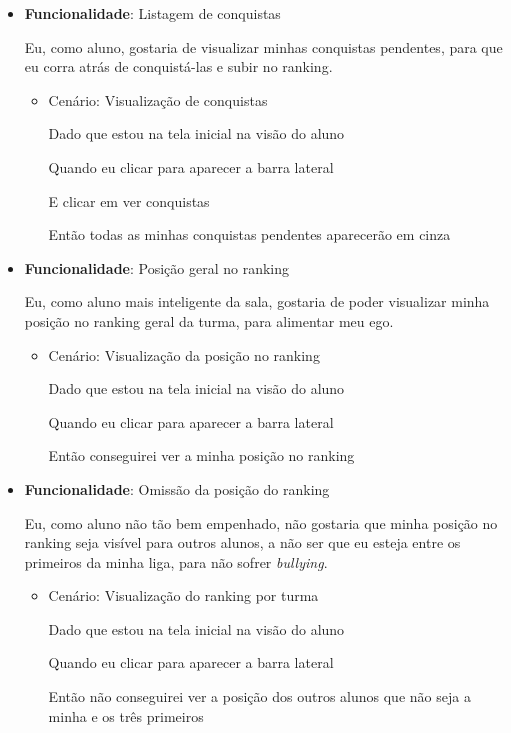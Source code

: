 \begin{itemize}
\item\textbf{Funcionalidade}: Listagem de conquistas
    
    Eu, como aluno, gostaria de visualizar minhas conquistas pendentes, para que eu corra atrás de conquistá-las e subir no ranking.
    \begin{itemize}
        \item Cenário: Visualização de conquistas 
        \par Dado que estou na tela inicial na visão do aluno
        \par Quando eu clicar para aparecer a barra lateral
        \par E clicar em ver conquistas
        \par Então todas as minhas conquistas pendentes aparecerão em cinza
    \end{itemize}  

\item\textbf{Funcionalidade}: Posição geral no ranking
    
    Eu, como aluno mais inteligente da sala, gostaria de poder visualizar minha posição no ranking geral da turma, para alimentar meu ego.
    \begin{itemize}
        \item Cenário: Visualização da posição no ranking
        \par Dado que estou na tela inicial na visão do aluno
        \par Quando eu clicar para aparecer a barra lateral
        \par Então conseguirei ver a minha posição no ranking
    \end{itemize}  

\item\textbf{Funcionalidade}: Omissão da posição do ranking
    
    Eu, como aluno não tão bem empenhado, não gostaria que minha posição no ranking seja visível para outros alunos, a não ser que eu esteja entre os primeiros da minha liga, para não sofrer \textit{bullying}.
    \begin{itemize}
        \item Cenário: Visualização do ranking por turma
        \par Dado que estou na tela inicial na visão do aluno
        \par Quando eu clicar para aparecer a barra lateral
        \par Então não conseguirei ver a posição dos outros alunos que não seja a minha e os três primeiros
    \end{itemize}  


\end{itemize}
